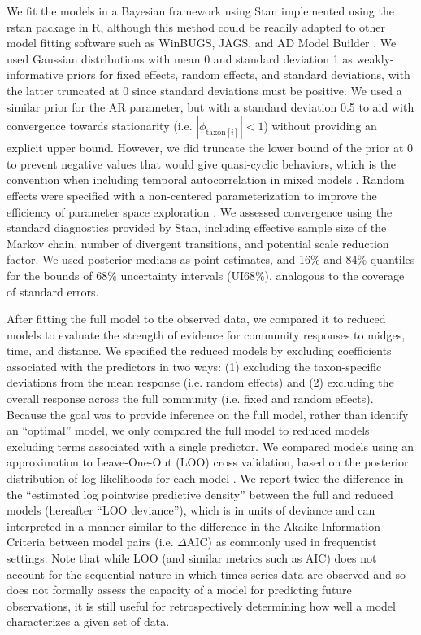 We fit the models in a Bayesian framework using Stan \citep{Carpenter2017}
implemented using the rstan \citep{Stan2018} package in R,
although this method could be readily adapted to other model fitting software
such as WinBUGS, JAGS, and AD Model Builder \citep{Bolker2013}.
We used Gaussian distributions with mean 0 and standard deviation 1 as
weakly-informative priors \citep{Gelman2017}
for fixed effects, random effects, and standard deviations,
with the latter truncated at 0 since standard deviations must be positive.
We used a similar prior for the AR parameter, but with a standard deviation 0.5 to
aid with convergence towards stationarity (i.e. $|\phi_{\text{taxon}[i]}|<1$) without
providing an explicit upper bound.
However, we did truncate the lower bound of the prior at 0 to prevent negative
values that would give quasi-cyclic behaviors, which is the convention when
including temporal autocorrelation in mixed models \citep{Zuur2009}.
Random effects were specified with a non-centered parameterization
to improve the efficiency of parameter space exploration \citep{Betancourt2015}.
We assessed convergence using the standard diagnostics provided by Stan,
including effective sample size of the Markov chain, number of divergent
transitions, and potential scale reduction factor.
We used posterior medians as point estimates,
and 16\% and 84\% quantiles
for the bounds of 68\% uncertainty intervals (UI68\%),
analogous to the coverage of standard errors.

After fitting the full model to the observed data, we compared it to reduced models
to evaluate the strength of evidence for community responses to midges, time,
and distance.
We specified the reduced models by excluding coefficients associated with the
predictors in two ways: (1) excluding the taxon-specific deviations from the mean
response (i.e. random effects) and (2) excluding the overall response across the
full community (i.e. fixed and random effects).
Because the goal was to provide inference on the full model, rather than identify
an ``optimal'' model, we only compared the full model to reduced models
excluding terms associated with a single predictor.
We compared models using an approximation to Leave-One-Out (LOO) cross validation,
based on the posterior distribution of log-likelihoods for each model
\citep{Vehtari2017}.
We report twice the difference in the ``estimated log pointwise predictive density''
between the full and reduced models (hereafter ``LOO deviance''), which is in units of
deviance and can interpreted in a manner similar to the difference in the
Akaike Information Criteria between model pairs (i.e. $\Delta$AIC) as
commonly used in frequentist settings.
Note that while LOO (and similar metrics such as AIC) does not account for the
sequential nature in which times-series data are observed and so does not formally
assess the capacity of a model for predicting future observations,
it is still useful for retrospectively determining
how well a model characterizes a given set of data.
